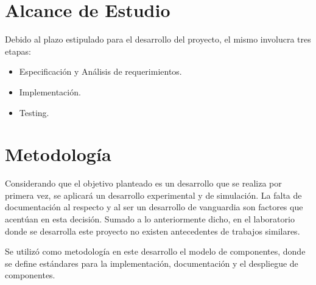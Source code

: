 \section{Alcance de Estudio}

Debido al plazo estipulado para el desarrollo del proyecto, el mismo involucra tres etapas: 

 \begin {itemize}
\item Especificación y Análisis de requerimientos.
\item Implementación.
\item Testing.
 \end {itemize}


\section{Metodología}

Considerando que el objetivo planteado es un desarrollo que se realiza por primera vez, se aplicará un desarrollo experimental y de simulación. La falta de documentación al respecto y al ser un desarrollo de vanguardia son factores que acentúan en esta decisión. Sumado a lo anteriormente dicho, en el laboratorio donde se desarrolla este proyecto no existen antecedentes de trabajos similares.
 
Se utilizó como metodología en este desarrollo el modelo de componentes, donde se define estándares para la implementación, documentación y el despliegue de componentes. 







